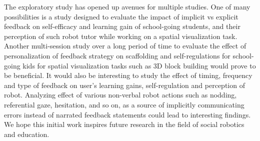 The exploratory study has opened up avenues for multiple studies. One of many possibilities is a study designed to evaluate the impact of implicit vs explicit feedback on self-efficacy and learning gain of school-going students, and their perception of such robot tutor while working on a spatial visualization task. Another multi-session study over a long period of time to evaluate the effect of personalization of feedback strategy on scaffolding and self-regulations for school-going kids for spatial visualization tasks such as 3D block building would prove to be beneficial. It would also be interesting to study the effect of timing, frequency and type of feedback on user's learning gains, self-regulation and perception of robot. Analyzing effect of various non-verbal robot actions such as nodding, referential gaze, hesitation, and so on, as a source of implicitly communicating errors instead of narrated feedback statements could lead to interesting findings. We hope this initial work inspires future research in the field of social robotics and education.  
